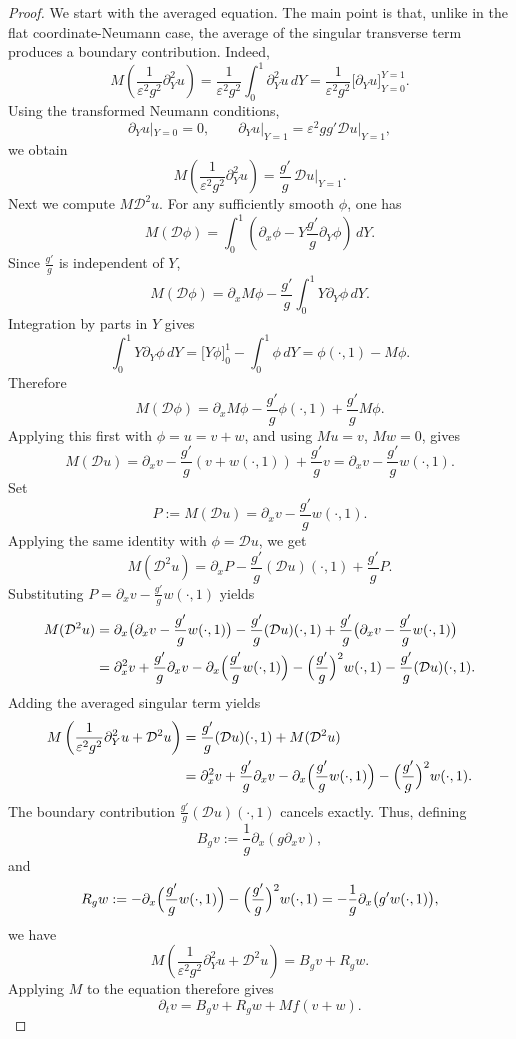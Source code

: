 \documentclass[11pt]{article}
\theoremstyle{definition}
\theoremstyle{remark}
\numberwithin{equation}{section}
\begin{document}
\begin{proof}
We start with the averaged equation. 
The main point is that, unlike in the flat coordinate-Neumann case, the average of the singular transverse term produces a boundary contribution. Indeed,
\[
M\left(\frac1{\varepsilon^2g^2}\partial_Y^2u\right)
=
\frac1{\varepsilon^2g^2}
\int_0^1\partial_Y^2u\,dY
=
\frac1{\varepsilon^2g^2}
\bigl[\partial_Yu\bigr]_{Y=0}^{Y=1}.
\]
Using the transformed Neumann conditions,
\[
\partial_Yu|_{Y=0}=0,
\qquad
\partial_Yu|_{Y=1}
=
\varepsilon^2gg'\mathcal Du|_{Y=1},
\]
we obtain
\[
M\left(\frac1{\varepsilon^2g^2}\partial_Y^2u\right)
=
\frac{g'}g\,\mathcal Du|_{Y=1}.
\]
Next we compute \(M\mathcal D^2u\). For any sufficiently smooth \(\phi\), one has
\[
M(\mathcal D\phi)
=
\int_0^1(\partial_x\phi-Y \frac{g'}g\partial_Y\phi)\,dY.
\]
Since \(\frac{g'}g\) is independent of \(Y\),
\[
M(\mathcal D\phi)
=
\partial_xM\phi
-
\frac{g'}g\int_0^1Y\partial_Y\phi\,dY.
\]
Integration by parts in \(Y\) gives
\[
\int_0^1Y\partial_Y\phi\,dY
=
\bigl[Y\phi\bigr]_{0}^{1}
-
\int_0^1\phi\,dY
=
\phi(\cdot,1)-M\phi.
\]
Therefore
\[
M(\mathcal D\phi)
=
\partial_x M\phi
-
\frac{g'}g\phi(\cdot,1)
+
\frac{g'}g M\phi.
\]
Applying this first with \(\phi=u=v+w\), and using \(Mu=v\), \(Mw=0\), gives
\[
M(\mathcal Du)
=
\partial_xv-\frac{g'}g(v+w(\cdot,1))+\frac{g'}g v
=
\partial_xv-\frac{g'}g w(\cdot,1).
\]
Set
\[
P:=M(\mathcal Du)=\partial_xv-\frac{g'}g w(\cdot,1).
\]
Applying the same identity with \(\phi=\mathcal Du\), we get
\[
M(\mathcal D^2u)
=
\partial_xP
-
\frac{g'}g(\mathcal Du)(\cdot,1)
+
\frac{g'}gP.
\]
Substituting \(P=\partial_xv-\frac{g'}gw(\cdot,1)\) yields
\[
\begin{aligned}
M(\mathcal D^2u)
&=
\partial_x\bigl(\partial_xv-\frac{g'}gw(\cdot,1)\bigr)
-
\frac{g'}g(\mathcal Du)(\cdot,1)
+
\frac{g'}g\bigl(\partial_xv-\frac{g'}g w(\cdot,1)\bigr)
\\
&=
\partial_x^2v
+
\frac{g'}g\partial_xv
-
\partial_x\Bigl(\frac{g'}gw(\cdot,1)\Bigr)
-
\Bigl(\frac{g'}g\Bigr)^2w(\cdot,1)
-
\frac{g'}g(\mathcal Du)(\cdot,1).
\end{aligned}
\]
Adding the averaged singular term yields
\[
\begin{aligned}
M\left(
\frac1{\varepsilon^2g^2}\partial_Y^2u+\mathcal D^2u
\right)
&=
\frac{g'}g(\mathcal Du)(\cdot,1)
+
M(\mathcal D^2u)
\\
&=
\partial_x^2v
+
\frac{g'}g\partial_xv
-
\partial_x\Bigl(\frac{g'}g w(\cdot,1)\Bigr)
-
\Bigl( \frac{g'}g\Bigr)^2w(\cdot,1).
\end{aligned}
\]
The boundary contribution \(\frac{g'}g(\mathcal Du)(\cdot,1)\) cancels exactly. Thus, defining
\[
 B_gv:=\frac1g\partial_x(g\partial_xv),
\]
and
\[
R_gw
:=
-\partial_x\Bigl( \frac{g'}g w(\cdot,1)\Bigr)-\Bigl(\frac{g'}g\Bigr)^2w(\cdot,1)= -\frac1g\partial_x\bigl(g'w(\cdot,1)\bigr),
\]
we have
\[
M\left(
\frac1{\varepsilon^2g^2}\partial_Y^2u+\mathcal D^2u
\right)
=
B_gv+R_gw.
\]
Applying \(M\) to the equation therefore gives
\[
\partial_tv
=
 B_gv+R_gw+Mf(v+w).
\]


\end{proof}
\end{document}
